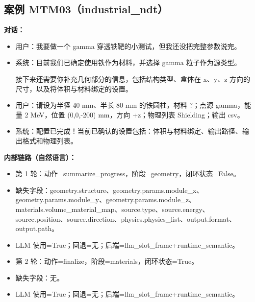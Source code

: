 \documentclass[11pt]{ctexart}
\begin{document}
\subsection{案例 MTM03（industrial\_ndt）}
\textbf{对话：}
\begin{itemize}
\item 用户：我要做一个 gamma 穿透铁靶的小测试，但我还没把完整参数说完。
\item 系统：目前我们已确定使用铁作为材料，并选择 gamma 粒子作为源类型。

接下来还需要你补充几何部分的信息，包括结构类型、盒体在 x、y、z 方向的尺寸，以及将体积与材料绑定的设置。
\item 用户：请设为半径 40 mm、半长 80 mm 的铁圆柱，材料 ?；点源 gamma，能量 2 MeV，位置 (0,0,-200) mm，方向 +z；物理列表 Shielding；输出 csv。
\item 系统：配置已完成！当前已确认的设置包括：体积与材料绑定、输出路径、输出格式和物理列表。
\end{itemize}
\textbf{内部链路（自然语言）：}
\begin{itemize}
\item 第 1 轮：动作=summarize\_progress，阶段=geometry，闭环状态=False。
\item 缺失字段：geometry.structure、geometry.params.module\_x、geometry.params.module\_y、geometry.params.module\_z、materials.volume\_material\_map、source.type、source.energy、source.position、source.direction、physics.physics\_list、output.format、output.path。
\item LLM 使用=True；回退=无；后端=llm\_slot\_frame+runtime\_semantic。
\item 第 2 轮：动作=finalize，阶段=materials，闭环状态=True。
\item 缺失字段：无。
\item LLM 使用=True；回退=无；后端=llm\_slot\_frame+runtime\_semantic。
\end{itemize}
\end{document}
